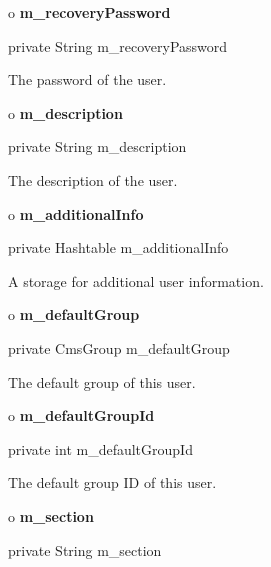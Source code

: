 o {\bf m\_recoveryPassword} 

\begin{PRE}
 private String m\_recoveryPassword
\end{PRE}

\begin{description}
\htmlDD The password of the user.

\end{description}

o {\bf m\_description} 

\begin{PRE}
 private String m\_description
\end{PRE}

\begin{description}
\htmlDD The description of the user.

\end{description}

o {\bf m\_additionalInfo} 

\begin{PRE}
 private Hashtable m\_additionalInfo
\end{PRE}

\begin{description}
\htmlDD A storage for additional user information.

\end{description}

o {\bf m\_defaultGroup} 

\begin{PRE}
 private CmsGroup m\_defaultGroup
\end{PRE}

\begin{description}
\htmlDD The default group of this user.

\end{description}

o {\bf m\_defaultGroupId} 

\begin{PRE}
 private int m\_defaultGroupId
\end{PRE}

\begin{description}
\htmlDD The default group ID of this user.

\end{description}

o {\bf m\_section} 

\begin{PRE}
 private String m\_section
\end{PRE}

